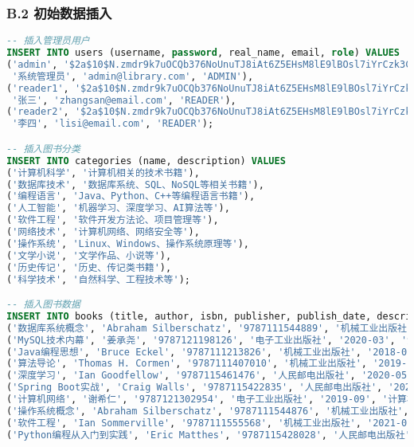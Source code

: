 \documentclass[12pt,a4paper]{article}
\begin{document}
\subsubsection*{B.2 初始数据插入}
\begin{lstlisting}[language=sql]
-- 插入管理员用户
INSERT INTO users (username, password, real_name, email, role) VALUES
('admin', '$2a$10$N.zmdr9k7uOCQb376NoUnuTJ8iAt6Z5EHsM8lE9lBOsl7iYrCzk3C', 
 '系统管理员', 'admin@library.com', 'ADMIN'),
('reader1', '$2a$10$N.zmdr9k7uOCQb376NoUnuTJ8iAt6Z5EHsM8lE9lBOsl7iYrCzk3C', 
 '张三', 'zhangsan@email.com', 'READER'),
('reader2', '$2a$10$N.zmdr9k7uOCQb376NoUnuTJ8iAt6Z5EHsM8lE9lBOsl7iYrCzk3C', 
 '李四', 'lisi@email.com', 'READER');

-- 插入图书分类
INSERT INTO categories (name, description) VALUES
('计算机科学', '计算机相关的技术书籍'),
('数据库技术', '数据库系统、SQL、NoSQL等相关书籍'),
('编程语言', 'Java、Python、C++等编程语言书籍'),
('人工智能', '机器学习、深度学习、AI算法等'),
('软件工程', '软件开发方法论、项目管理等'),
('网络技术', '计算机网络、网络安全等'),
('操作系统', 'Linux、Windows、操作系统原理等'),
('文学小说', '文学作品、小说等'),
('历史传记', '历史、传记类书籍'),
('科学技术', '自然科学、工程技术等');

-- 插入图书数据
INSERT INTO books (title, author, isbn, publisher, publish_date, description, total_quantity, available_quantity, category_id) VALUES
('数据库系统概念', 'Abraham Silberschatz', '9787111544889', '机械工业出版社', '2019-01', '数据库系统的经典教材，全面介绍数据库理论与实践', 5, 5, 2),
('MySQL技术内幕', '姜承尧', '9787121198126', '电子工业出版社', '2020-03', '深入解析MySQL InnoDB存储引擎', 3, 3, 2),
('Java编程思想', 'Bruce Eckel', '9787111213826', '机械工业出版社', '2018-06', 'Java编程的经典教材', 8, 7, 3),
('算法导论', 'Thomas H. Cormen', '9787111407010', '机械工业出版社', '2019-12', '计算机算法的权威教材', 4, 4, 1),
('深度学习', 'Ian Goodfellow', '9787115461476', '人民邮电出版社', '2020-05', '深度学习领域的重要著作', 6, 5, 4),
('Spring Boot实战', 'Craig Walls', '9787115422835', '人民邮电出版社', '2021-08', 'Spring Boot开发实践指南', 10, 9, 3),
('计算机网络', '谢希仁', '9787121302954', '电子工业出版社', '2019-09', '计算机网络原理教材', 7, 7, 6),
('操作系统概念', 'Abraham Silberschatz', '9787111544876', '机械工业出版社', '2020-01', '操作系统理论与实践', 5, 4, 7),
('软件工程', 'Ian Sommerville', '9787111555568', '机械工业出版社', '2021-03', '软件工程方法论', 3, 3, 5),
('Python编程从入门到实践', 'Eric Matthes', '9787115428028', '人民邮电出版社', '2020-11', 'Python编程入门教程', 12, 11, 3);
\end{lstlisting}
\end{document}

